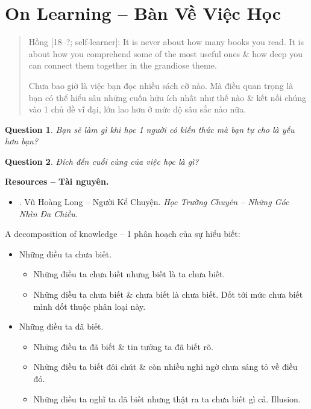 \documentclass[12pt]{article}
\newtheorem{question}{Question}
\begin{document}

\section{On Learning -- Bàn Về Việc Học}
\label{sect: learning}

\begin{quote}
	{\sf Hồng [18--?; self-learner]}: It is never about how many books you read. It is about how you comprehend some of the most useful ones \& how deep you can connect them together in the grandiose theme.
	
	Chưa bao giờ là việc bạn đọc nhiều sách cỡ nào. Mà điều quan trọng là bạn có thể hiểu sâu những cuốn hữu ích nhất như thế nào \& kết nối chúng vào 1 chủ đề vĩ đại, lớn lao hơn ở mức độ sâu sắc nào nữa.
\end{quote}


\begin{question}
	Bạn sẽ làm gì khi học 1 người có kiến thức mà bạn tự cho là yếu hơn bạn?
\end{question}

\begin{question}
	Đích đến cuối cùng của việc học là gì?
\end{question}

\noindent\textbf{\textsf{Resources -- Tài nguyên.}}
\begin{itemize}
	\item \cite{Long2021}. Vũ Hoàng Long -- Người Kể Chuyện. {\it Học Trường Chuyên -- Những Góc Nhìn Đa Chiều}.
\end{itemize}

A decomposition of knowledge -- 1 phân hoạch của sự hiểu biết:
\begin{itemize}
	\item Những điều ta chưa biết.
	\begin{itemize}
		\item Những điều ta chưa biết nhưng biết là ta chưa biết.
		\item Những điều ta chưa biết \& chưa biết là chưa biết. Dốt tới mức chưa biết mình dốt thuộc phân loại này.
	\end{itemize}
	\item Những điều ta đã biết.
	\begin{itemize}
		\item Những điều ta đã biết \& tin tưởng ta đã biết rõ.
		\item Những điều ta biết đôi chút \& còn nhiều nghi ngờ chưa sáng tỏ về điều đó.
		\item Những điều ta nghĩ ta đã biết nhưng thật ra ta chưa biết gì cả. Illusion.
	\end{itemize}
\end{itemize}
\end{document}
